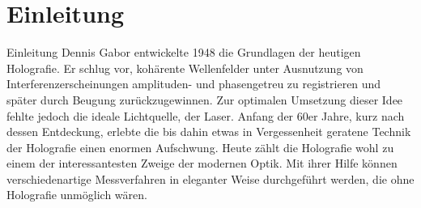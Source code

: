 \chapter{Einleitung}
Einleitung 
Dennis Gabor entwickelte 1948 die Grundlagen der heutigen Holografie. 
Er schlug vor, kohärente Wellenfelder unter Ausnutzung von Interferenzerscheinungen amplituden- und phasengetreu zu registrieren und später durch Beugung zurückzugewinnen. 
Zur optimalen Umsetzung dieser Idee fehlte jedoch die ideale Lichtquelle, der Laser. 
Anfang der 60er Jahre, kurz nach dessen Entdeckung, erlebte die bis dahin etwas in Vergessenheit geratene Technik der Holografie einen enormen Aufschwung. 
Heute zählt die Holografie wohl zu einem der interessantesten Zweige der modernen Optik. 
Mit ihrer Hilfe können verschiedenartige Messverfahren in eleganter Weise durchgeführt werden, die ohne Holografie unmöglich wären.
